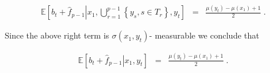 \documentclass{article}
\numberwithin{equation}{section}
\theoremstyle{plain}
\theoremstyle{plain}
\theoremstyle{plain}
\theoremstyle{remark}
\theoremstyle{remark}
\newcommand{\1}{\ensuremath{\mathbbm{1}}}
\newcommand{\E}{\mathbb{E}}
\newcommand{\Dfrac}[2]{{\displaystyle \frac{#1}{#2}}}
\begin{document}
\begin{eqnarray*}
\E\left[b_{t}+\hat{f}_{p-1}\left|x_{1},\bigcup_{r=1}^{p-1}\left\{y_{s},s\in T_{r}\right\}, y_{t}\right.\right] &=& \Dfrac{\mu\left(y_{t}\right)-\mu\left(x_{1}\right)+1}{2}\;.
\end{eqnarray*}

Since the above right term is $\sigma(x_{1},y_{t})$- measurable we conclude that

\begin{eqnarray*}
\E\left[b_{t}+\hat{f}_{p-1}\left|x_{1},y_{t}\right.\right] &=& \Dfrac{\mu\left(y_{t}\right)-\mu\left(x_{1}\right)+1}{2}\;.
\end{eqnarray*}
 



\end{document}
